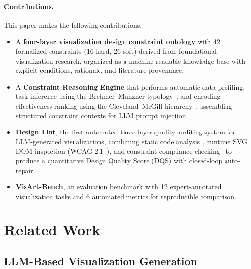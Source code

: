 \documentclass[final,5p,times,twocolumn]{elsarticle}
\begin{document}
\paragraph{Contributions.} This paper makes the following contributions:
\begin{itemize}
  \item A \textbf{four-layer visualization design constraint ontology} with 42 formalized constraints (16 hard, 26 soft) derived from foundational visualization research, organized as a machine-readable knowledge base with explicit conditions, rationale, and literature provenance.
  \item A \textbf{Constraint Reasoning Engine} that performs automatic data profiling, task inference using the Brehmer--Munzner typology~\cite{brehmer2013multi}, and encoding effectiveness ranking using the Cleveland--McGill hierarchy~\cite{cleveland1984graphical}, assembling structured constraint contexts for LLM prompt injection.
  \item \textbf{Design Lint}, the first automated three-layer quality auditing system for LLM-generated visualizations, combining static code analysis~\cite{mcnutt2018vislint}, runtime SVG DOM inspection (WCAG 2.1~\cite{wcag21}), and constraint compliance checking~\cite{chen2022vizlinter} to produce a quantitative Design Quality Score (DQS) with closed-loop auto-repair.
  \item \textbf{VisArt-Bench}, an evaluation benchmark with 12 expert-annotated visualization tasks and 6 automated metrics for reproducible comparison.
\end{itemize}


\section{Related Work}

\subsection{LLM-Based Visualization Generation}
\end{document}
